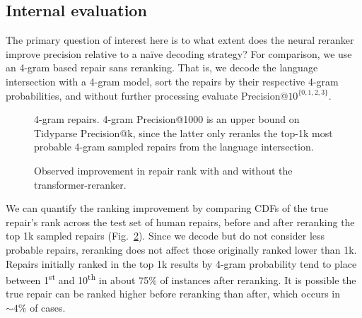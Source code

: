 \documentclass[sigplan,review,acmsmall,nonacm,screen,anonymous]{acmart}\settopmatter{printfolios=false,printccs=false,printacmref=false}
\begin{document}
\clearpage\subsection{Internal evaluation}\label{sec:rq3}

The primary question of interest here is to what extent does the neural reranker improve precision relative to a na\"ive decoding strategy? For comparison, we use an 4-gram based repair sans reranking. That is, we decode the language intersection with a 4-gram model, sort the repairs by their respective 4-gram probabilities, and without further processing evaluate Precision@$10^{\{0, 1, 2, 3\}}$.\vspace{-0.2cm}
\begin{figure}[H]
\resizebox{.24\textwidth}{!}{}
\resizebox{.24\textwidth}{!}{}
\resizebox{.24\textwidth}{!}{}
\resizebox{.24\textwidth}{!}{}
\caption{4-gram repairs. 4-gram Precision@1000 is an upper bound on Tidyparse Precision@k, since the latter only reranks the top-1k most probable 4-gram sampled repairs from the language intersection.}\label{fig:adaptive}
\end{figure}\vspace{-0.2cm}

\begin{figure}
\vspace{-0.35cm}
%
%
\resizebox{.45\textwidth}{!}{}
\vspace{-0.8cm}
\caption{Observed improvement in repair rank with and without the transformer-reranker.}
\label{fig:rank_cdf}
\vspace{-0.3cm}
\end{figure}

We can quantify the ranking improvement by comparing CDFs of the true repair's rank across the test set of human repairs, before and after reranking the top 1k sampled repairs (Fig.~\ref{fig:rank_cdf}). Since we decode but do not consider less probable repairs, reranking does not affect those originally ranked lower than 1k. Repairs initially ranked in the top 1k results by 4-gram probability tend to place between 1\textsuperscript{st} and 10\textsuperscript{th} in about 75\% of instances after reranking. It is possible the true repair can be ranked higher before reranking than after, which occurs in $\sim4\%$ of cases.
\end{document}
